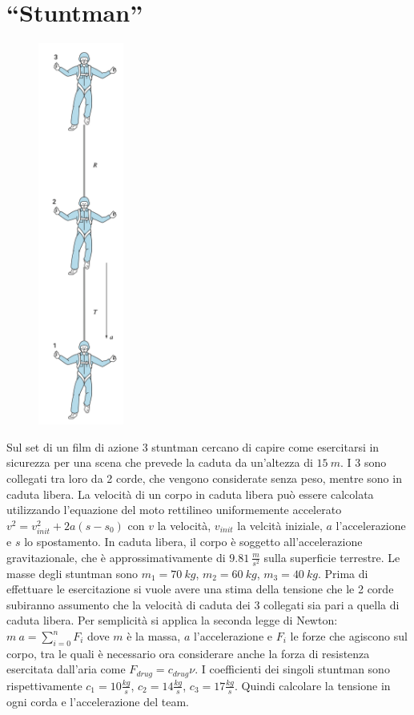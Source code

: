 \documentclass[oneside]{article}
\begin{document}
\section{``Stuntman''}

\begin{figure}
   \centering
   \includegraphics[width=0.25\textwidth]{stuntman.png}
\end{figure}

Sul set di un film di azione 3 stuntman cercano di capire come esercitarsi in sicurezza
per una scena che prevede la caduta da un'altezza di $15 \: m$. I 3 sono collegati tra
loro da 2 corde, che vengono considerate senza peso, mentre sono in caduta libera. La
velocità di un corpo in caduta libera può essere calcolata utilizzando l'equazione del
moto rettilineo uniformemente accelerato $v^2 = v_{init}^2 + 2a(s - s_0)$ con $v$ la
velocità, $v_{init}$ la velcità iniziale, $a$ l'accelerazione e $s$ lo spostamento. In
caduta libera, il corpo è soggetto all'accelerazione gravitazionale, che è
approssimativamente di $9.81 \: \frac{m}{s^2}$ sulla superficie terrestre. Le masse degli
stuntman sono $m_1 = 70 \: kg$, $m_2 = 60 \: kg$, $m_3 = 40 \: kg$. Prima di effettuare
le esercitazione si vuole avere una stima della tensione che le 2 corde subiranno
assumento che la velocità di caduta dei 3 collegati sia pari a quella di caduta libera.
Per semplicità si applica la seconda legge di Newton: $m \: a = \sum_{i=0}^{n}F_i$ dove
$m$ è la massa, $a$ l'accelerazione e $F_i$ le forze che agiscono sul corpo, tra le quali
è necessario ora considerare anche la forza di resistenza esercitata dall'aria come
$F_{drug} = c_{drug} \nu$. I coefficienti dei singoli stuntman sono rispettivamente $c_1
= 10 \frac{kg}{s}$, $c_2 = 14 \frac{kg}{s}$, $c_3 = 17 \frac{kg}{s}$. Quindi calcolare la
tensione in ogni corda e l'accelerazione del team. 
\end{document}
